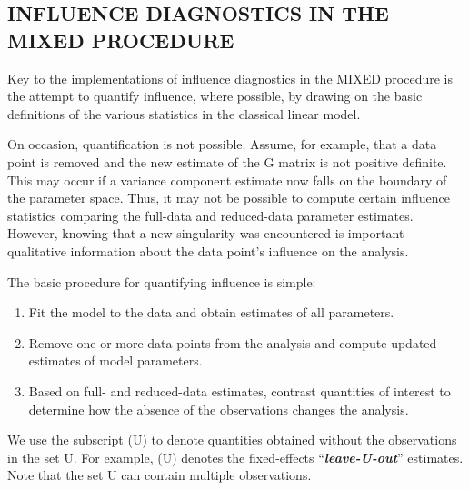 \documentclass[00-MASTER.tex]{subfiles}
\begin{document}
	
	
	
	\subsection{INFLUENCE DIAGNOSTICS IN THE MIXED PROCEDURE}
	Key to the implementations of influence diagnostics in the MIXED procedure is the attempt to quantify
	influence, where possible, by drawing on the basic definitions of the various statistics in the classical linear
	model. 
	
	On occasion, quantification is not possible. Assume, for example, that a data point is removed
	and the new estimate of the G matrix is not positive definite. This may occur if a variance component
	estimate now falls on the boundary of the parameter space. Thus, it may not be possible to compute certain
	influence statistics comparing the full-data and reduced-data parameter estimates. However, knowing that
	a new singularity was encountered is important qualitative information about the data point’s influence on
	the analysis.
	
	The basic procedure for quantifying influence is simple:
	
	\begin{enumerate}
		\item Fit the model to the data and obtain estimates of all parameters.
		\item Remove one or more data points from the analysis and compute updated estimates of model parameters.
		\item Based on full- and reduced-data estimates, contrast quantities of interest to determine how the absence
		of the observations changes the analysis.
	\end{enumerate}
	We use the subscript (U) to denote quantities obtained without the observations in the set U. For example,
	(U) denotes the fixed-effects “\textit{\textbf{leave-U-out}}” estimates. Note that the set U can contain multiple observations.
	
\end{document}
